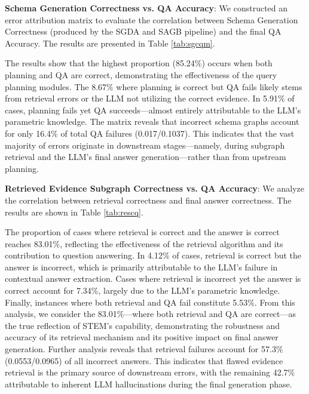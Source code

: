 \documentclass[11pt]{article}
\begin{document}
\textbf{Schema Generation Correctness vs. QA Accuracy}: We constructed an error attribution matrix to evaluate the correlation between Schema Generation Correctness (produced by the SGDA and SAGB pipeline) and the final QA Accuracy. The results are presented in Table \ref{tab:sgcqm}.

The results show that the highest proportion (85.24\%) occurs when both planning and QA are correct, demonstrating the effectiveness of the query planning modules. The 8.67\% where planning is correct but QA fails likely stems from retrieval errors or the LLM not utilizing the correct evidence. In 5.91\% of cases, planning fails yet QA succeeds—almost entirely attributable to the LLM’s parametric knowledge. The matrix reveals that incorrect schema graphs account for only 16.4\% of total QA failures (0.017/0.1037). This indicates that the vast majority of errors originate in downstream stages—namely, during subgraph retrieval and the LLM's final answer generation—rather than from upstream planning.

\textbf{Retrieved Evidence Subgraph Correctness vs. QA Accuracy}: We analyze the correlation between retrieval correctness and final answer correctness. The results are shown in Table \ref{tab:rescq}.

The proportion of cases where retrieval is correct and the answer is correct reaches 83.01\%, reflecting the effectiveness of the retrieval algorithm and its contribution to question answering. In 4.12\% of cases, retrieval is correct but the answer is incorrect, which is primarily attributable to the LLM's failure in contextual answer extraction. Cases where retrieval is incorrect yet the answer is correct account for 7.34\%, largely due to the LLM's parametric knowledge. Finally, instances where both retrieval and QA fail constitute 5.53\%. From this analysis, we consider the 83.01\%—where both retrieval and QA are correct—as the true reflection of STEM's capability, demonstrating the robustness and accuracy of its retrieval mechanism and its positive impact on final answer generation. Further analysis reveals that retrieval failures account for 57.3\% (0.0553/0.0965) of all incorrect answers. This indicates that flawed evidence retrieval is the primary source of downstream errors, with the remaining 42.7\% attributable to inherent LLM hallucinations during the final generation phase.
\end{document}
